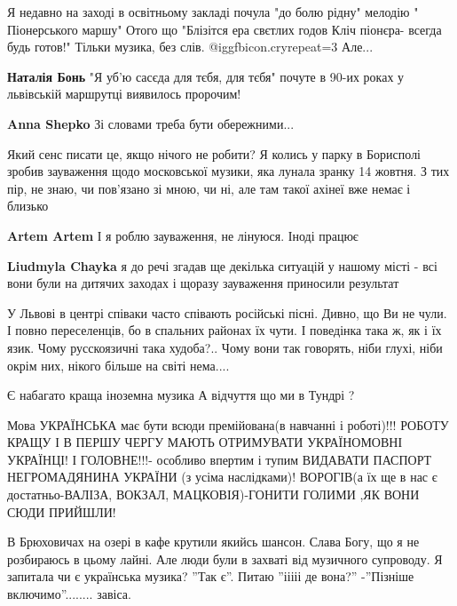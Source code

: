 \begin{itemize}
Я недавно на заході в освітньому закладі почула "до болю рідну" мелодію "
Піонерського маршу" Отого що "Блізітся ера свєтлих годов Кліч піонєра- всегда
будь готов!" Тільки музика, без слів.  @igg{fbicon.cry}{repeat=3} Але...

\begin{itemize} %
\textbf{Наталія Бонь} "Я уб'ю сасєда для тєбя, для тєбя" почуте в 90-их роках у львівській маршрутці виявилось пророчим!

\textbf{Anna Shepko} Зі словами треба бути обережними...
\end{itemize} %


Який сенс писати це, якщо нічого не робити? Я колись у парку в Борисполі зробив
зауваження щодо московської музики, яка лунала зранку 14 жовтня. З тих пір, не
знаю, чи пов'язано зі мною, чи ні, але там такої ахінеї вже немає і близько

\begin{itemize} %
\textbf{Artem Artem} І я роблю зауваження, не лінуюся. Іноді працює

\textbf{Liudmyla Chayka} я до речі згадав ще декілька ситуацій у нашому місті - всі вони були на дитячих заходах і щоразу зауваження приносили результат
\end{itemize} %


У Львові в центрі співаки часто співають російські пісні. Дивно, що Ви не чули.
І повно переселенців, бо в спальних районах їх чути. І поведінка така ж, як і
їх язик. Чому русскоязичні така худоба?.. Чому вони так говорять, ніби глухі,
ніби окрім них, нікого більше на світі нема....

Є набагато краща іноземна музика
А відчуття що ми в Тундрі ?


Мова УКРАЇНСЬКА має бути всюди премійована(в навчанні і роботі)!!!
РОБОТУ КРАЩУ І В ПЕРШУ ЧЕРГУ МАЮТЬ ОТРИМУВАТИ УКРАЇНОМОВНІ УКРАЇНЦІ!
І ГОЛОВНЕ!!!- особливо впертим і тупим ВИДАВАТИ ПАСПОРТ НЕГРОМАДЯНИНА УКРАЇНИ (з усіма наслідками)!
ВОРОГІВ(а їх ще в нас є достатньо-ВАЛІЗА, ВОКЗАЛ, МАЦКОВІЯ)-ГОНИТИ ГОЛИМИ ,ЯК ВОНИ СЮДИ ПРИЙШЛИ!


В Брюховичах на озері в кафе крутили якийсь шансон. Слава Богу, що я не
розбираюсь в цьому лайні. Але люди були в захваті від музичного супроводу. Я
запитала чи є українська музика? ''Так є''. Питаю ''ііііі де вона?'' -''Пізніше
включимо''........ завіса.


\end{itemize}
